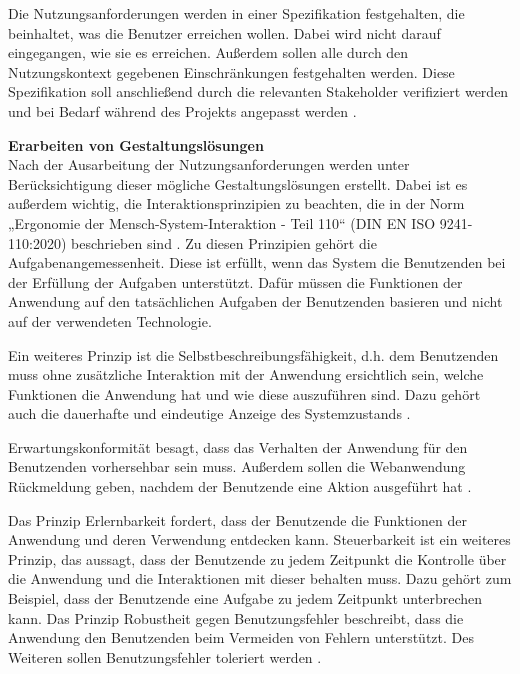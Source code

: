 \documentclass[utf8,biblatex]{lni}
\begin{document}
Die Nutzungsanforderungen werden in einer Spezifikation festgehalten, die beinhaltet, was die Benutzer erreichen wollen. Dabei wird nicht darauf eingegangen, wie sie es erreichen. Außerdem sollen alle durch den Nutzungskontext gegebenen Einschränkungen festgehalten werden. Diese Spezifikation soll anschließend durch die relevanten Stakeholder verifiziert werden und bei Bedarf während des Projekts angepasst werden \cite[vgl.][22\psq]{DINDeutschesInstitutfurNormunge.V..f}.

\textbf{Erarbeiten von Gestaltungslösungen}\\
Nach der Ausarbeitung der Nutzungsanforderungen werden unter Berücksichtigung dieser mögliche Gestaltungslösungen erstellt. Dabei ist es außerdem wichtig, die Interaktionsprinzipien zu beachten, die in der Norm „Ergonomie der Mensch-System-Interaktion - Teil 110“ (DIN EN ISO 9241-110:2020) beschrieben sind \cite[vgl.][11]{DINDeutschesInstitutfurNormunge.V..f}. Zu diesen Prinzipien gehört die Aufgabenangemessenheit. Diese ist erfüllt, wenn das System die Benutzenden bei der Erfüllung der Aufgaben unterstützt. Dafür müssen die Funktionen der Anwendung auf den tatsächlichen Aufgaben der Benutzenden basieren und nicht auf der verwendeten Technologie.

Ein weiteres Prinzip ist die Selbstbeschreibungsfähigkeit, d.h. dem Benutzenden muss ohne zusätzliche Interaktion mit der Anwendung ersichtlich sein, welche Funktionen die Anwendung hat und wie diese auszuführen sind. Dazu gehört auch die dauerhafte und eindeutige Anzeige des Systemzustands \cite[vgl.][12]{DINDeutschesInstitutfurNormunge.V..f}.

Erwartungskonformität besagt, dass das Verhalten der Anwendung für den Benutzenden vorhersehbar sein muss. Außerdem sollen die Webanwendung Rückmeldung geben, nachdem der Benutzende eine Aktion ausgeführt hat \cite[vgl.][21]{DINDeutschesInstitutfurNormunge.V..f}.

Das Prinzip Erlernbarkeit fordert, dass der Benutzende die Funktionen der Anwendung und deren Verwendung entdecken kann. Steuerbarkeit ist ein weiteres Prinzip, das aussagt, dass der Benutzende zu jedem Zeitpunkt die Kontrolle über die Anwendung und die Interaktionen mit dieser behalten muss. Dazu gehört zum Beispiel, dass der Benutzende eine Aufgabe zu jedem Zeitpunkt unterbrechen kann. Das Prinzip Robustheit gegen Benutzungsfehler beschreibt, dass die Anwendung den Benutzenden beim Vermeiden von Fehlern unterstützt. Des Weiteren sollen Benutzungsfehler
toleriert werden \cite[vgl.][30]{DINDeutschesInstitutfurNormunge.V..f}.
\end{document}
